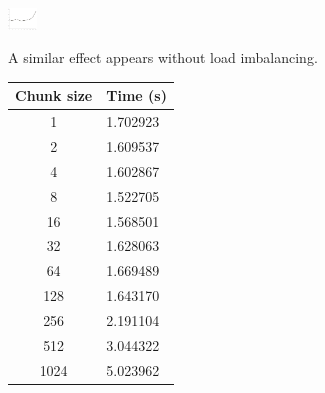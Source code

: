 \documentclass{article}[12pt;letterpaper]
\begin{document}
\includegraphics[width=0.3in]{a2_sec2_1.png}

A similar effect appears without load imbalancing.

\begin{tabular}{c l}
Chunk size & Time (s) \\
\hline{}
   1 & 1.702923 \\
   2 & 1.609537 \\
   4 & 1.602867 \\
   8 & 1.522705 \\
  16 & 1.568501 \\
  32 & 1.628063 \\
  64 & 1.669489 \\
 128 & 1.643170 \\
 256 & 2.191104 \\
 512 & 3.044322 \\
1024 & 5.023962
\end{tabular}

\includegraphics[width=0.3]{a2_sec2_2.png}
\end{document}
